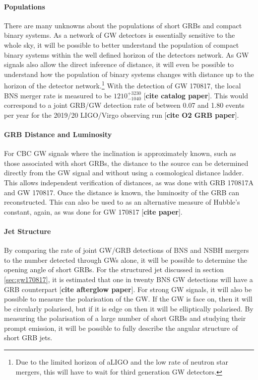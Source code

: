 \documentclass[11pt]{cuthesis}
\begin{document}
\paragraph{Populations}
There are many unknowns about the populations of short GRBs and compact binary systems. As a network of GW detectors is essentially sensitive to the whole sky, it will be possible to better understand the population of compact binary systems within the well defined horizon of the detectors network. As GW signals also allow the direct inference of distance, it will even be possible to understand how the population of binary systems changes with distance up to the horizon of the detector network.\footnote{Due to the limited horizon of aLIGO and the low rate of neutron star mergers, this will have to wait for third generation GW detectors.} With the detection of GW 170817, the local BNS merger rate is measured to be $1210^{+3230}_{-1040}$ [\textbf{cite catalog paper}]. This would correspond to a joint GRB/GW detection rate of between 0.07 and 1.80 events per year for the 2019/20 LIGO/Virgo observing run [\textbf{cite O2 GRB paper}]. 

\paragraph{GRB Distance and Luminosity}
For CBC GW signals where the inclination is approximately known, such as those associated with short GRBs, the distance to the source can be determined directly from the GW signal and without using a cosmological distance ladder. This allows independent verification of distances, as was done with GRB 170817A and GW 170817. Once the distance is known, the luminosity of the GRB can reconstructed. This can also be used to as an alternative measure of Hubble's constant, again, as was done for GW 170817 [\textbf{cite paper}]. 

\paragraph{Jet Structure}
By comparing the rate of joint GW/GRB detections of BNS and NSBH mergers to the number detected through GWs alone, it will be possible to determine the opening angle of short GRBs. For the structured jet discussed in section \ref{sec:gw170817}, it is estimated that one in twenty BNS GW detections will have a GRB counterpart [\textbf{cite afterglow paper}]. For strong GW signals, it will also be possible to measure the polarisation of the GW. If the GW is face on, then it will be circularly polarised, but if it is edge on then it will be elliptically polarised. By measuring the polarisation of a large number of short GRBs and studying their prompt emission, it will be possible to fully describe the angular structure of short GRB jets. 
\end{document}
